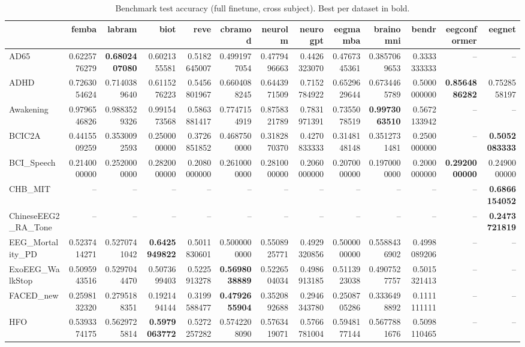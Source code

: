 \begin{table}[htbp]
\caption{Benchmark test accuracy (full finetune, cross subject). Best per dataset in bold.}
\label{tab:benchmark_results_full_finetune_cross_subject}
\begin{tabular}{lrrrrrrrrrrrr}
\toprule
 & femba & labram & biot & reve & cbramod & neurolm & neurogpt & eegmamba & brainomni & bendr & eegconformer & eegnet \\
\midrule
AD65 & 0.6225776279 & \bfseries 0.6802407080 & 0.6021355581 & 0.5182645007 & 0.4991977054 & 0.4779496663 & 0.4426323070 & 0.4767345361 & 0.3857069653 & 0.3333333333 & -- & -- \\
ADHD & 0.7263054624 & 0.7140389640 & 0.6115276223 & 0.5456801967 & 0.6604088245 & 0.6443971509 & 0.7152784922 & 0.6529629644 & 0.6734465789 & 0.5000000000 & \bfseries 0.8564886282 & 0.7528558197 \\
Awakening & 0.9796546826 & 0.9883529326 & 0.9915473568 & 0.5863881417 & 0.7747154919 & 0.8758321789 & 0.7831971391 & 0.7355078519 & \bfseries 0.9973063510 & 0.5672133942 & -- & -- \\
BCIC2A & 0.4415509259 & 0.3530092593 & 0.2500000000 & 0.3726851852 & 0.4687500000 & 0.3182870370 & 0.4270833333 & 0.3148148148 & 0.3512731481 & 0.2500000000 & -- & \bfseries 0.5052083333 \\
BCI_Speech & 0.2140000000 & 0.2520000000 & 0.2820000000 & 0.2080000000 & 0.2610000000 & 0.2810000000 & 0.2060000000 & 0.2070000000 & 0.1970000000 & 0.2000000000 & \bfseries 0.2920000000 & 0.2490000000 \\
CHB_MIT & -- & -- & -- & -- & -- & -- & -- & -- & -- & -- & -- & \bfseries 0.6866154052 \\
ChineseEEG2_RA_Tone & -- & -- & -- & -- & -- & -- & -- & -- & -- & -- & -- & \bfseries 0.2473721819 \\
EEG_Mortality_PD & 0.5237414271 & 0.5270741042 & \bfseries 0.6425949822 & 0.5011830601 & 0.5000000000 & 0.5508925771 & 0.4929320856 & 0.5000000000 & 0.5588436902 & 0.4998089206 & -- & -- \\
ExoEEG_WalkStop & 0.5095943516 & 0.5297044470 & 0.5073699403 & 0.5225913278 & \bfseries 0.5698038889 & 0.5226504034 & 0.4986913185 & 0.5113923038 & 0.4907527757 & 0.5015321413 & -- & -- \\
FACED_new & 0.2598132320 & 0.2795188351 & 0.1921494144 & 0.3199588477 & \bfseries 0.4792655904 & 0.3520892688 & 0.2946343780 & 0.2508705286 & 0.3336498892 & 0.1111111111 & -- & -- \\
HFO & 0.5393374175 & 0.5629725814 & \bfseries 0.5979063772 & 0.5272257282 & 0.5742208090 & 0.5763419071 & 0.5766781004 & 0.5948177144 & 0.5677881676 & 0.5098110465 & -- & -- \\

\end{tabular}
\end{table}
